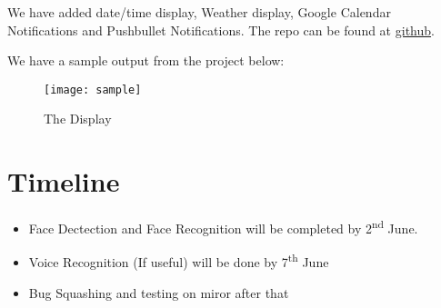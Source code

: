 \documentclass[11pt,a4paper]{article}
\begin{document}
    We have added date/time display, Weather display, Google Calendar Notifications and Pushbullet Notifications.
    The repo can be found at \href{https://github.com/11000011/Smart-Mirror.git}{github}.

    We have a sample output from the project below:
    \begin{figure}[!ht]
      \centering
      \texttt{[image: sample]}
      \caption{The Display}
    \end{figure}
  \newpage
  \section{Timeline}
    \begin{itemize}
      \item Face Dectection and Face Recognition will be completed by 2\textsuperscript{nd} June.
      \item Voice Recognition (If useful) will be done by 7\textsuperscript{th} June
      \item Bug Squashing and testing on miror after that
    \end{itemize}
\end{document}
